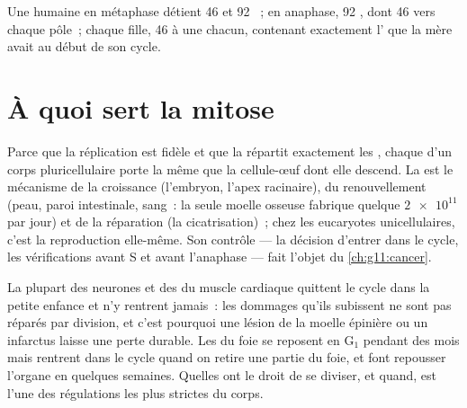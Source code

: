 \begin{example}\label{ex:g11:cell-cycle-mitosis:human}
Une  humaine en métaphase détient 46  et 92
~; en anaphase, 92 , dont 46 vers chaque pôle~;
chaque fille, 46  à une  chacun, contenant
exactement l' que la mère avait au début de son cycle.
\end{example}

\section{À quoi sert la mitose}

\begin{proposition}\label{prop:g11:cell-cycle-mitosis:conformity}
Parce que la réplication est fidèle et que la  répartit
exactement les , chaque  d'un corps pluricellulaire
porte la même  que la cellule-œuf dont elle
descend. La  est le mécanisme de la croissance (l'embryon, l'apex
racinaire), du renouvellement (peau, paroi intestinale, sang~: la
seule moelle osseuse fabrique quelque $\num{2e11}$  par jour)
et de la réparation (la cicatrisation)~; chez les eucaryotes
unicellulaires, c'est la reproduction elle-même. Son contrôle --- la
décision d'entrer dans le cycle, les vérifications avant S et avant
l'anaphase --- fait l'objet du \cref{ch:g11:cancer}.
\end{proposition}
\admitted

\begin{remark}\label{rem:g11:cell-cycle-mitosis:notall}
La plupart des neurones et des  du muscle cardiaque quittent le
cycle dans la petite enfance et n'y rentrent jamais~: les dommages
qu'ils subissent ne sont pas réparés par division, et c'est pourquoi
une lésion de la moelle épinière ou un infarctus laisse une perte
durable. Les  du foie se reposent en $\mathrm{G_1}$ pendant des
mois mais rentrent dans le cycle quand on retire une partie du foie, et
font repousser l'organe en quelques semaines. Quelles  ont le
droit de se diviser, et quand, est l'une des régulations les plus
strictes du corps.
\end{remark}

